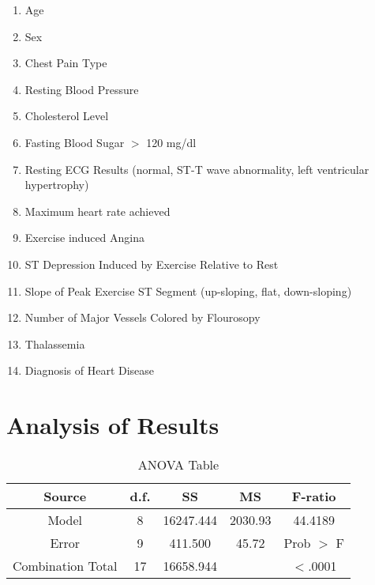 \documentclass[times]{article}
\begin{document}
   \begin{enumerate}
      \itemsep0em
      \item Age
      \item Sex
      \item Chest Pain Type
      \item Resting Blood Pressure
      \item Cholesterol Level
      \item Fasting Blood Sugar $>$ 120 mg/dl
      \item Resting ECG Results (normal, ST-T wave abnormality, left ventricular hypertrophy)
      \item Maximum heart rate achieved
      \item Exercise induced Angina
      \item ST Depression Induced by Exercise Relative to Rest
      \item Slope of Peak Exercise ST Segment (up-sloping, flat, down-sloping)
      \item Number of Major Vessels Colored by Flourosopy
      \item Thalassemia
      \item Diagnosis of Heart Disease
   \end{enumerate}

   \section{Analysis of Results}

   \begin{table}[H]
      \centering
      \caption{ANOVA Table}
      \label{tab:anova}
      \begin{tabular}{| c | c | c | c | c |}
         \hline
         Source              & d.f.   & SS        & MS      & F-ratio    \\
         \hline
         Model               & 8      & 16247.444 & 2030.93 & 44.4189    \\
         \hline
         Error               & 9      & 411.500   & 45.72   & Prob $>$ F \\
         \hline
         Combination Total   & 17     & 16658.944 &         & $<$.0001   \\
         \hline
      \end{tabular}
   \end{table}
\end{document}
